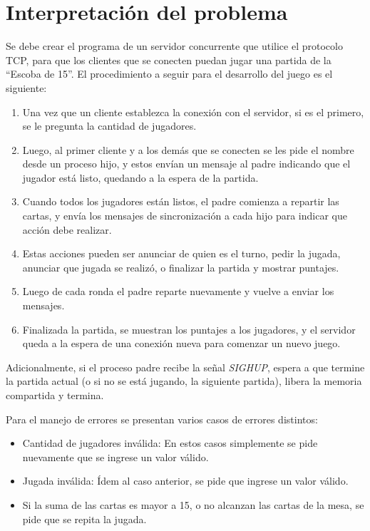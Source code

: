 \section{Interpretación del problema}

Se debe crear el programa de un servidor concurrente que utilice el protocolo TCP, para que los clientes que se conecten puedan jugar una partida de la ``Escoba de 15''. El procedimiento a seguir para el desarrollo del juego es el siguiente:

\begin{enumerate}\bfseries
    \item \textnormal{Una vez que un cliente establezca la conexión con el servidor, si es el primero, se le pregunta la cantidad de jugadores.}
    \item \textnormal{Luego, al primer cliente y a los demás que se conecten se les pide el nombre desde un proceso hijo, y estos envían un mensaje al padre indicando que el jugador está listo, quedando a la espera de la partida.}
    \item \textnormal{Cuando todos los jugadores están listos, el padre comienza a repartir las cartas, y envía los mensajes de sincronización a cada hijo para indicar que acción debe realizar.}
    \item \textnormal{Estas acciones pueden ser anunciar de quien es el turno, pedir la jugada, anunciar que jugada se realizó, o finalizar la partida y mostrar puntajes.}
    \item \textnormal{Luego de cada ronda el padre reparte nuevamente y vuelve a enviar los mensajes.}
    \item \textnormal{Finalizada la partida, se muestran los puntajes a los jugadores, y el servidor queda a la espera de una conexión nueva para comenzar un nuevo juego.}\\ 
\end{enumerate}

Adicionalmente, si el proceso padre recibe la señal \textit{SIGHUP}, espera a que termine la partida actual (o si no se está jugando, la siguiente partida), libera la memoria compartida y termina.

Para el manejo de errores se presentan varios casos de errores distintos: 

\begin{itemize}
    \item Cantidad de jugadores inválida: En estos casos simplemente se pide nuevamente que se ingrese un valor válido.
    \item Jugada inválida:  Ídem al caso anterior, se pide que ingrese un valor válido.
    \item Si la suma de las cartas es mayor a 15, o no alcanzan las cartas de la mesa, se pide que se repita la jugada.
\end{itemize}